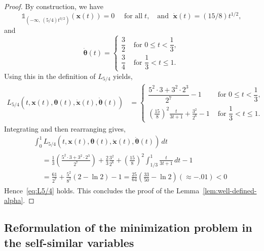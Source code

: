 \documentclass[10pt]{amsart}
\theoremstyle{definition}\newtheorem{defi}[theo]{Definition}\newtheorem{rema}[theo]{Remark}\newtheorem{exam}[theo]{Example}\newtheorem{exem}[theo]{Example}\newtheorem{nota}[theo]{Notation}
\newcommand{\bx}{\mathbf{x}}
\newcommand{\btheta}{\boldsymbol{\theta}}
\newcommand{\1}{\mathds{1}}
\begin{document}
\begin{proof}
By construction, we have
\[
\1_{\left(-\infty,\,(5/4) t^{3/2}\right)}(\bx(t))=0\quad\text{ for all}\;t, \quad\text{and }\;\dot{\bx}(t)=(15/8)t^{1/2},
\]
and
\[
\dot{\btheta}(t) =
\begin{cases}
\dfrac{3}{2} & \text{ for } 0\leq t<\dfrac{1}{3},
\\[0.70em]
\dfrac{3}{4}& \text{ for } \dfrac{1}{3}<t\leq 1.
\end{cases}
\]
Using this in the definition of $L_{5/4}$ yields,
\begin{align*}
L_{5/4}\left(t,\bx(t), \btheta(t), \dot{ \bx}(t), \dot{\btheta}(t)\right) &=
\begin{cases}
\dfrac{5^2\cdot 3+3^2\cdot 2^3}{2^7} -1 & \text{ for } 0\leq t<\dfrac{1}{3},
\\[0.50em]
\displaystyle \left(\frac{15}{8}\right)^2\frac{t}{3t+1} + \frac{3^2}{2^6}-1 & \text{ for } \dfrac{1}{3}<t\leq 1.
\end{cases}
\end{align*}
Integrating and then rearranging gives,
\begin{multline*}
\int_0^1L_{5/4}\left(t,\bx(t), \btheta(t), \dot{ \bx}(t), \dot{\btheta}(t)\right)\, dt \\
\begin{aligned}
&=\frac{1}{3}\left(\frac{5^2\cdot 3+3^2\cdot 2^3}{2^7}\right) + \frac{2}{3}\frac{3^2}{2^6} + \left(\frac{15}{8}\right)^2\int_{1/3}^{1}\frac{t}{3t+1}\, dt-1\\
&= \frac{61}{ 2^7}+\frac{5^2}{8^2}(2-\ln 2)-1 = \frac{25}{64}\left (\frac{33}{50} - \ln 2 \right)(\approx -.01)<0
\end{aligned}
\end{multline*}
Hence~\eqref{eq:L5/4} holds. This concludes the proof of the Lemma~\ref{lem:well-defined-alpha}.
\end{proof}



\subsection{Reformulation of the minimization problem in the self-similar variables}\label{sec:self-similar}
\end{document}
